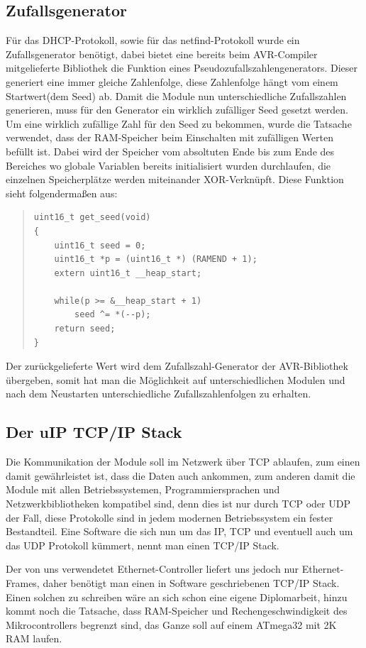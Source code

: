 \documentclass[a4paper,14pt,headsepline]{scrartcl}
\begin{document}
\subsection{Zufallsgenerator}
Für das DHCP-Protokoll, sowie für das netfind-Protokoll wurde ein Zufallsgenerator benötigt, dabei bietet eine bereits beim AVR-Compiler mitgelieferte Bibliothek die Funktion eines Pseudozufallszahlengenerators. Dieser generiert eine immer gleiche Zahlenfolge, diese Zahlenfolge hängt vom einem Startwert(dem Seed) ab. Damit die Module nun unterschiedliche Zufallszahlen generieren, muss für den Generator ein wirklich zufälliger Seed gesetzt werden. Um eine wirklich zufällige Zahl für den Seed zu bekommen, wurde die Tatsache verwendet, dass der RAM-Speicher beim Einschalten mit zufälligen Werten befüllt ist. Dabei wird der Speicher vom absoltuten Ende bis zum Ende des Bereiches wo globale Variablen bereits initialisiert wurden durchlaufen, die einzelnen Speicherplätze werden miteinander XOR-Verknüpft. Diese Funktion sieht folgendermaßen aus:
\begin{quote}
\begin{verbatim}
uint16_t get_seed(void)
{
    uint16_t seed = 0;
    uint16_t *p = (uint16_t *) (RAMEND + 1);
    extern uint16_t __heap_start;

    while(p >= &__heap_start + 1)
        seed ^= *(--p);
    return seed;
}
\end{verbatim}
\end{quote}

Der zurückgelieferte Wert wird dem Zufallszahl-Generator der AVR-Bibliothek übergeben, somit hat man die Möglichkeit auf unterschiedlichen Modulen und nach dem Neustarten unterschiedliche Zufallszahlenfolgen zu erhalten.


\subsection{Der uIP TCP/IP Stack}
Die Kommunikation der Module soll im Netzwerk über TCP ablaufen, zum einen damit gewährleistet ist, dass die Daten auch ankommen, zum anderen damit die Module mit allen Betriebssystemen, Programmiersprachen und Netzwerkbibliotheken kompatibel sind, denn dies ist nur durch TCP oder UDP der Fall, diese Protokolle sind in jedem modernen Betriebssystem ein fester Bestandteil. Eine Software die sich nun um das IP, TCP und eventuell auch um das UDP Protokoll kümmert, nennt man einen TCP/IP Stack.

Der von uns verwendetet Ethernet-Controller liefert uns jedoch nur Ethernet-Frames, daher benötigt man einen in Software geschriebenen TCP/IP Stack. Einen solchen zu schreiben wäre an sich schon eine eigene Diplomarbeit, hinzu kommt noch die Tatsache, dass RAM-Speicher und Rechengeschwindigkeit des Mikrocontrollers begrenzt sind, das Ganze soll auf einem ATmega32 mit 2K RAM laufen.
\end{document}
